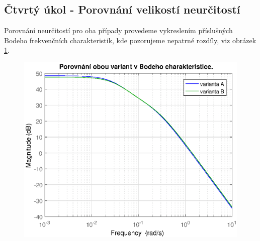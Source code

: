 \documentclass[a4paper,11pt]{article}
\begin{document}
\subsection{Čtvrtý úkol - Porovnání velikostí neurčitostí}
Porovnání neurčitostí pro oba případy provedeme vykreslením příslušných Bodeho frekvenčních charakteristik, kde pozorujeme nepatrné rozdíly, viz obrázek \ref{fig:porovnani_neurcitosti}.
\begin{figure}[htbp]
	\begin{center}
	\includegraphics[scale = 1.0]{obrazky/porovnaniNeurcitosti.eps}
	\label{fig:porovnani_neurcitosti}
	\end{center}
\end{figure}


\newpage
\end{document}
